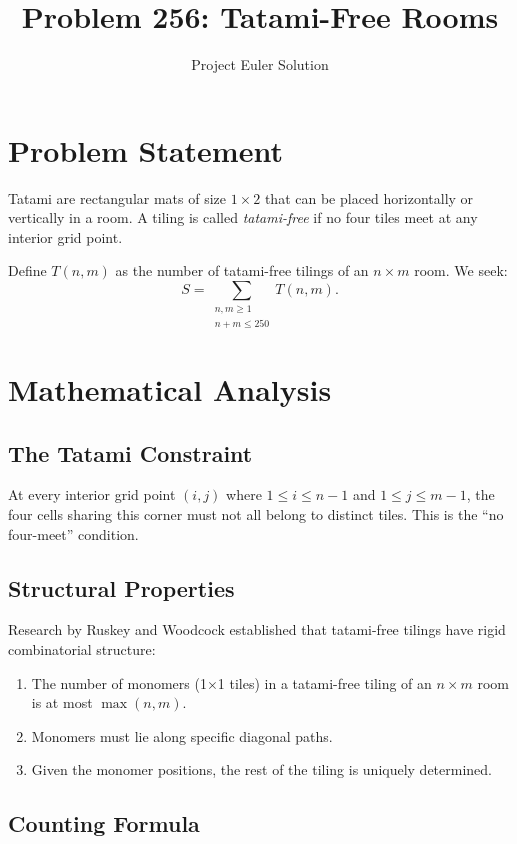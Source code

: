 \documentclass[12pt]{article}
\title{Problem 256: Tatami-Free Rooms}
\author{Project Euler Solution}
\date{}
\begin{document}
\maketitle

\section{Problem Statement}

Tatami are rectangular mats of size $1 \times 2$ that can be placed horizontally or vertically in a room. A tiling is called \emph{tatami-free} if no four tiles meet at any interior grid point.

Define $T(n,m)$ as the number of tatami-free tilings of an $n \times m$ room. We seek:
\[
S = \sum_{\substack{n,m \ge 1 \\ n+m \le 250}} T(n,m).
\]

\section{Mathematical Analysis}

\subsection{The Tatami Constraint}

At every interior grid point $(i,j)$ where $1 \le i \le n-1$ and $1 \le j \le m-1$, the four cells sharing this corner must not all belong to distinct tiles. This is the ``no four-meet'' condition.

\subsection{Structural Properties}

Research by Ruskey and Woodcock established that tatami-free tilings have rigid combinatorial structure:

\begin{enumerate}
    \item The number of monomers (1$\times$1 tiles) in a tatami-free tiling of an $n \times m$ room is at most $\max(n,m)$.
    \item Monomers must lie along specific diagonal paths.
    \item Given the monomer positions, the rest of the tiling is uniquely determined.
\end{enumerate}

\subsection{Counting Formula}
\end{document}
